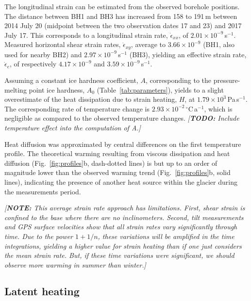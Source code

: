 \documentclass[utf8]{article}
\newcommand{\note}[1]{\textcolor{c0}{\emph{[\textbf{NOTE:} #1]}}}
\newcommand{\todo}[1]{\textcolor{c3}{\emph{[\textbf{TODO:} #1]}}}
\begin{document}
    The longitudinal strain can be estimated from the observed borehole
    positions. The distance between BH1 and BH3
    has increased from 158 to 191\,m between 2014 July 20 (midpoint
    between the two observation dates 17 and 23) and 2017 July 17. This
    corresponds to a longitudinal strain rate, $\dot\epsilon_{xx}$, of
    $2.01\times10^{-9}$\,s$^{-1}$. Measured horizontal shear strain rates,
    $\dot\epsilon_{xy}$, average to $3.66\times10^{-9}$ (BH1, also used for
    nearby BH2) and $2.97\times10^{-9}$\,s$^{-1}$ (BH3), yielding an effective
    strain rate, $\dot\epsilon_e$, of respectively $4.17\times10^{-9}$ and
    $3.59\times10^{-9}$\,s$^{-1}$.

    Assuming a constant ice hardness coefficient, $A$, corresponding to the
    pressure-melting point ice hardness, $A_0$ (Table~\ref{tab:parameters}),
    yields to a slight overestimate of the heat dissipation due to strain
    heating, $H$, at $1.79\times10^3$\,Pa\,s$^{-1}$. The corresponding
    rate of temperature change is $2.93\times10^{-2}$\,$^{\circ}$C\,a$^{-1}$,
    which is negligible as compared to the observed temperature changes.
    \todo{Include temperature effect into the computation of A.}

    Heat diffusion was approximated by central differences on the first
    temperature profile. The theoretical warming resulting from viscous
    dissipation and heat diffusion (Fig.~\ref{fig:profiles}b, dash-dotted
    lines) is but up to an order of magnitude lower than the observed warming
    trend (Fig.~\ref{fig:profiles}b, solid lines), indicating the presence of
    another heat source within the glacier during the measurements period.

    \note{This average strain rate approach has limitations. First, shear
          strain is confined to the base where there are no inclinometers.
          Second, tilt measurements and GPS surface velocities show that all
          strain rates vary significantly through time. Due to the power
          $1+1/n$, these variations will be amplified in the time integrations,
          yielding a higher value for strain heating than if one just considers
          the mean strain rate. But, if these time variations were significant,
          we should observe more warming in summer than winter.}


\subsection{Latent heating}
\end{document}
